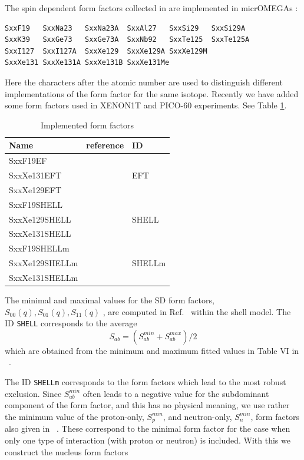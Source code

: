 \documentclass[12pt,a4paper]{article}
\begin{document}
The spin dependent   form factors collected in \cite{Bednyakov:2006ux} are implemented in micrOMEGAs
\cite{Belanger:2008sj}:
\begin{verbatim}
SxxF19   SxxNa23   SxxNa23A  SxxAl27   SxxSi29   SxxSi29A  
SxxK39   SxxGe73   SxxGe73A  SxxNb92   SxxTe125  SxxTe125A 
SxxI127  SxxI127A  SxxXe129  SxxXe129A SxxXe129M 
SxxXe131 SxxXe131A SxxXe131B SxxXe131Me 
\end{verbatim}
Here the  characters  after the atomic number are  used to distinguish different implementations of
the form factor for the same isotope. Recently we have added some form factors used in XENON1T and PICO-60 experiments. See Table
\ref{NewFF}.
\begin{table}[htbp]
\begin{center}
\begin{tabular}{|l|l|l|}
\hline
  Name      & reference            &  ID \\  
\hline
  SxxF19EF    &                      &   \\
  SxxXe131EFT & \cite{Fitzpatrick:2012ix}  &   EFT\\
  SxxXe129EFT &                      &    \\
\hline
   SxxF19SHELL&                      &  \\
   SxxXe129SHELL& \cite{Klos:2013rwa} & SHELL\\
   SxxXe131SHELL &                           & \\
\hline
   SxxF19SHELLm&                             & \\
   SxxXe129SHELLm& \cite{Klos:2013rwa} & SHELLm\\
   SxxXe131SHELLm &                           & \\
\hline
\end{tabular}
 \caption{Implemented form factors}
 \label{NewFF}

\end{center}
\end{table}

The  minimal and maximal values for the SD form factors, $S_{00}(q),S_{01}(q),S_{11}(q)$ , are computed in  Ref.~\cite{Klos:2013rwa} within the shell model.
The ID  {\tt SHELL} corresponds to the average 
\begin{equation}
\label{eq:middle}
   S_{ab}=(S_{ab}^{min} +S_{ab}^{max})/2
\end{equation}
which are obtained from  the minimum and maximum fitted values  in Table VI in ~\cite{Klos:2013rwa}. 

The ID {\tt SHELLm} corresponds to the form factors which lead to the most robust exclusion.  
Since  $S_{ab}^{min}$ often leads to a negative value for the subdominant component of the form factor, and this has no physical meaning, we use rather  
the minimum value of  the proton-only, $S_p^{min}$,   and neutron-only, $S_n^{min}$,  form factors also given in ~\cite{Klos:2013rwa}. 
These  correspond to the minimal form factor for the case when only one type of interaction (with proton or neutron) is included. With this we construct  
the nucleus form factors 
\end{document}
